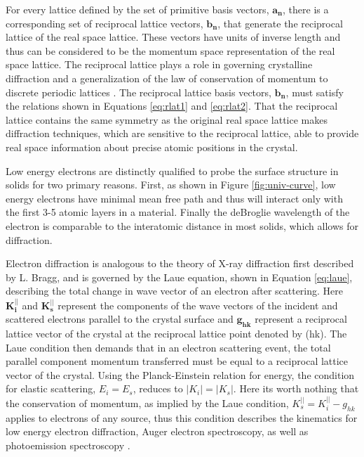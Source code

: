For every lattice defined by the set of primitive basis vectors, ${\mathbf{a_n}}$, there is a corresponding set of reciprocal lattice vectors, ${\mathbf{b_n}}$,  that generate the reciprocal lattice of the real space lattice.  These vectors have units of inverse length and thus can be considered to be the momentum space representation of the real space lattice. The reciprocal lattice plays a role in governing crystalline diffraction and a generalization of the law of conservation of momentum to discrete periodic lattices \cite{Ashcroft}. The reciprocal lattice basis vectors, ${\mathbf{b_n}}$, must satisfy the relations shown in Equations \ref{eq:rlat1} and \ref{eq:rlat2}. That the reciprocal lattice contains the same symmetry as the original real space lattice makes diffraction techniques, which are sensitive to the reciprocal lattice, able to provide real space information about precise atomic positions in the crystal.

Low energy electrons are distinctly qualified to probe the surface structure in solids for two primary reasons. First, as shown in Figure \ref{fig:univ-curve}, low energy electrons have minimal mean free path and thus will interact only with the first 3-5 atomic layers in a material. Finally the deBroglie wavelength of the electron is comparable to the interatomic distance in most solids, which allows for diffraction.

Electron diffraction is analogous to the theory of X-ray diffraction first described by L. Bragg, and is governed by the Laue equation, shown in Equation \ref{eq:laue}, describing the total change in wave vector of an electron after scattering. Here $\mathbf{K_{i}^{||}}$ and $\mathbf{K_{s}^{||}}$ represent the components of the wave vectors of the incident and scattered electrons parallel to the crystal surface and $\mathbf{g_{hk}}$ represent a reciprocal lattice vector of the crystal at the reciprocal lattice point denoted by (hk). The Laue condition then demands that in an electron scattering event, the total parallel component momentum transferred must be equal to a reciprocal lattice vector of the crystal. Using the Planck-Einstein relation for energy, the condition for elastic scattering, $E_i = E_s$, reduces to $|K_i| = |K_s|$. Here its worth nothing that the conservation of momentum, as implied by the Laue condition, $K_s^{||} = K_i^{||} - g_{hk}$ applies to electrons of any source, thus this condition describes the kinematics for low energy electron diffraction, Auger electron spectroscopy, as well as photoemission spectroscopy \cite{ SurfSciTechniques}. 

